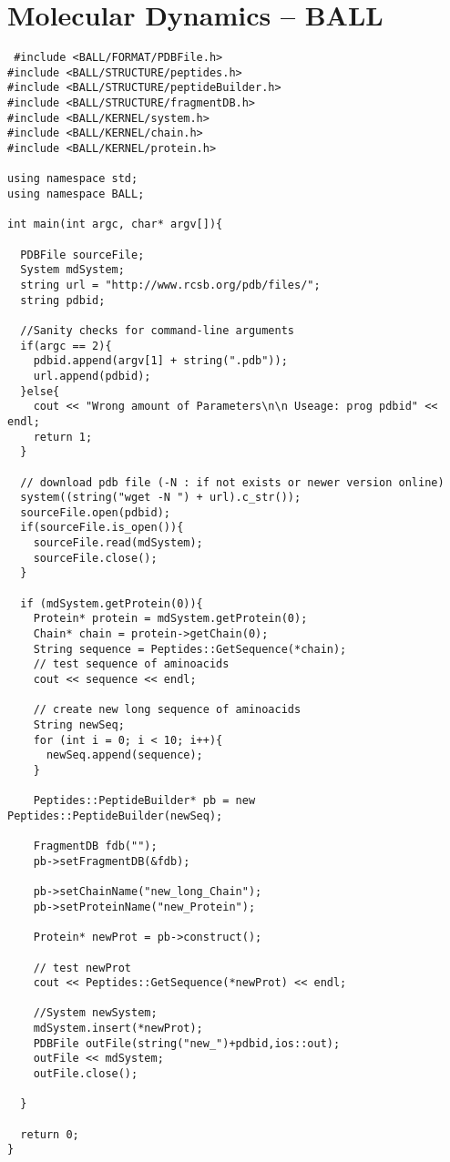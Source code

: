 \documentclass[11pt]{article}
\begin{document}
\section{Molecular Dynamics -- BALL}
\begin{lstlisting}
 #include <BALL/FORMAT/PDBFile.h>
#include <BALL/STRUCTURE/peptides.h>
#include <BALL/STRUCTURE/peptideBuilder.h>
#include <BALL/STRUCTURE/fragmentDB.h>
#include <BALL/KERNEL/system.h>
#include <BALL/KERNEL/chain.h>
#include <BALL/KERNEL/protein.h>

using namespace std;
using namespace BALL;

int main(int argc, char* argv[]){
  
  PDBFile sourceFile;
  System mdSystem;
  string url = "http://www.rcsb.org/pdb/files/";
  string pdbid;

  //Sanity checks for command-line arguments	
  if(argc == 2){
    pdbid.append(argv[1] + string(".pdb"));
    url.append(pdbid);
  }else{
    cout << "Wrong amount of Parameters\n\n Useage: prog pdbid" << endl;
    return 1;
  }

  // download pdb file (-N : if not exists or newer version online)
  system((string("wget -N ") + url).c_str());
  sourceFile.open(pdbid);
  if(sourceFile.is_open()){
    sourceFile.read(mdSystem);
    sourceFile.close();
  }

  if (mdSystem.getProtein(0)){
    Protein* protein = mdSystem.getProtein(0);
    Chain* chain = protein->getChain(0);
    String sequence = Peptides::GetSequence(*chain);
    // test sequence of aminoacids
    cout << sequence << endl;

    // create new long sequence of aminoacids
    String newSeq;
    for (int i = 0; i < 10; i++){
      newSeq.append(sequence);
    }

    Peptides::PeptideBuilder* pb = new Peptides::PeptideBuilder(newSeq);

    FragmentDB fdb("");
    pb->setFragmentDB(&fdb);
    
    pb->setChainName("new_long_Chain");
    pb->setProteinName("new_Protein");
    
    Protein* newProt = pb->construct();
    
    // test newProt
    cout << Peptides::GetSequence(*newProt) << endl;

    //System newSystem;
    mdSystem.insert(*newProt);
    PDBFile outFile(string("new_")+pdbid,ios::out);
    outFile << mdSystem;
    outFile.close();

  }
 
  return 0;
}

\end{lstlisting}
\end{document}
